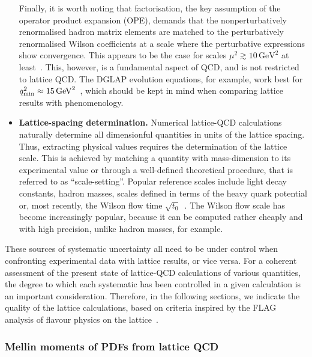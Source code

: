 \begin{itemize}
Finally, it is worth noting that factorisation, the key assumption of
the operator product expansion (OPE), demands that the
nonperturbatively renormalised hadron matrix elements are matched to the
perturbatively renormalised Wilson coefficients at a scale where the perturbative 
expressions show convergence. This appears to be
the case for scales $\mu^2 \gtrsim 10 \, \mbox{GeV}^2$ at
least~\cite{Gockeler:2010yr}. This, however, is a fundamental aspect
of QCD, and is not restricted to lattice QCD. The DGLAP evolution equations,
for example, work best for $q^2_{\rm min} \approx
15 \, \mbox{GeV}^2$~\cite{Abramowicz:2015mha}, which should be kept in
mind when comparing lattice results with phenomenology.

\item {\bfseries Lattice-spacing determination.} Numerical lattice-QCD calculations 
naturally determine all dimensionful quantities in units of the
lattice spacing. Thus, extracting physical values requires the
determination of the lattice scale. This is achieved by matching a
quantity with mass-dimension to its experimental value or through a
well-defined theoretical procedure, that is referred to as
``scale-setting''. Popular reference scales include light decay
constants, hadron masses, scales defined in terms of the heavy quark
potential or, most recently, the Wilson flow time
$\sqrt{t_0}$~\cite{Luscher:2010iy}. The Wilson flow scale has become
increasingly popular, because it can be computed rather cheaply and
with high precision, unlike hadron masses, for example.

\end{itemize}

These sources of systematic uncertainty all need to be under control
when confronting experimental data with lattice results, or vice
versa.
%
For a coherent assessment of the present state of lattice-QCD
calculations of various quantities, the degree to which each
systematic has been controlled in a given calculation is an important
consideration.
%
Therefore, in the following sections, we indicate the
quality of the lattice calculations, based on criteria inspired by the
FLAG analysis of flavour physics on the lattice~\cite{Aoki:2016frl}.


\subsubsection{Mellin moments of PDFs from lattice QCD}
\label{Sec:MomentsLQCD}

